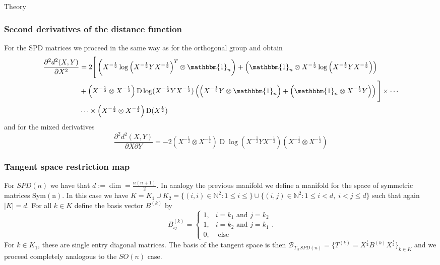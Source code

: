 \begin{chapter}{Theory}
\subsubsection{Second derivatives of the distance function} %
\label{ssub:SecondDerSPD}
For the SPD matrices we proceed in the same way as for the orthogonal group and obtain
\begin{align}
    \label{eq:spd_xx_der}
    \frac{\partial^2 d^2(X,Y)}{\partial X^2} &= 
    2\Bigg[
	\left(X^{-\frac{1}{2}}\log\left(X^{-\frac{1}{2}}YX^{-\frac{1}{2}}\right)^T\otimes\mathbbm{1}_n\right)
	+\left(\mathbbm{1}_n\otimes X^{-\frac{1}{2}}\log\left(X^{-\frac{1}{2}}YX^{-\frac{1}{2}}\right)\right) \\
    &	+\left(X^{-\frac{1}{2}}\otimes X^{-\frac{1}{2}}\right)\operatorname{D}\log(X^{-\frac{1}{2}}YX^{-\frac{1}{2}})\left( \left(X^{-\frac{1}{2}}Y\otimes\mathbbm{1}_n\right)
	+ \left(\mathbbm{1}_n\otimes X^{-\frac{1}{2}}Y\right)\right) 
    \Bigg] \times\cdots \nonumber \\
    & \cdots\times\left(X^{-\frac{1}{2}}\otimes X^{-\frac{1}{2}}\right)\operatorname{D}(X^{\frac{1}{2}})\nonumber
\end{align}
and for the mixed derivatives
\begin{equation}
    \label{eq:spd_xy_der}
    \frac{\partial^2 d^2(X,Y)}{\partial X\partial Y} = -2\left(X^{-\frac{1}{2}}\otimes X^{-\frac{1}{2}}\right)\operatorname{D}\log\left(X^{-\frac{1}{2}}Y X^{-\frac{1}{2}}\right)\left(X^{-\frac{1}{2}}\otimes X^{-\frac{1}{2}}\right)
\end{equation}

\subsubsection{Tangent space restriction map} %
\label{ssub:TangentSPD}
For $SPD(n)$ we have that $d:=\operatorname{dim}=\frac{n(n+1)}{2}$. In analogy the previous manifold we define a manifold for the space of symmetric matrices 
$\operatorname{Sym(n)}$. In this case we have $K= K_1\cup K_2=\lbrace (i,i)\in\mathbb{N}^2: 1\leq i\leq\rbrace \cup \lbrace (i,j)\in\mathbb{N}^2: 1\leq i < d,\; i < j \leq d  \rbrace$
such that again $|K|=d$. For all $k\in K$ define the basis vector $B^{(k)}$ by 
\begin{equation}
    B^{(k)}_{ij}=\begin{cases}
	1, & i=k_1 \text{ and } j=k_2\\
	1, & i=k_2 \text{ and } j=k_1\\
	0, & \text{ else }
    \end{cases}.
\end{equation}
For $k\in K_1$, these are single entry diagonal matrices.
The basis of the tangent space is then $\mathcal{B}_{T_XSPD(n)}=\lbrace T^{(k)} = X^{\frac{1}{2}}B^{(k)}X^{\frac{1}{2}} \rbrace_{k\in K}$ and we proceed completely analogous to the $SO(n)$ case.


\end{chapter}
